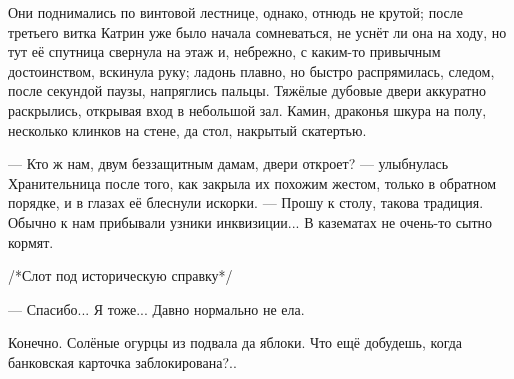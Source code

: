 Они поднимались по винтовой лестнице, однако, отнюдь не крутой; после третьего витка Катрин уже было начала сомневаться,
не уснёт ли она на ходу, но тут её спутница свернула на этаж и, небрежно, с каким-то привычным достоинством, вскинула руку;
ладонь плавно, но быстро распрямилась, следом, после секундой паузы, напряглись пальцы.
Тяжёлые дубовые двери аккуратно раскрылись, открывая вход в небольшой зал.
Камин, драконья шкура на полу, несколько клинков на стене, да стол, накрытый скатертью.

--- Кто ж нам, двум беззащитным дамам, двери откроет? --- улыбнулась Хранительница после того,
как закрыла их похожим жестом, только в обратном порядке, и в глазах её блеснули искорки. ---
Прошу к столу, такова традиция. Обычно к нам прибывали узники инквизиции... В казематах не очень-то сытно кормят.

/*Слот под историческую справку*/

--- Спасибо... Я тоже... Давно нормально не ела.

Конечно. Солёные огурцы из подвала да яблоки. Что ещё добудешь, когда банковская карточка заблокирована?..

\emptypar


\emptypar
